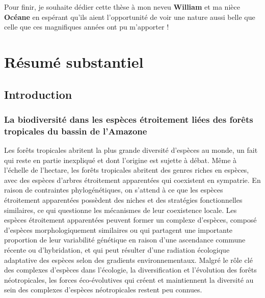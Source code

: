 \documentclass[12pt,twoside,a4paper, a]{article}
\let\oldsection\section
\renewcommand\section{\clearpage\oldsection}
\begin{document}
Pour finir, je souhaite dédier cette thèse à mon neveu \textbf{William} et ma
nièce \textbf{Océane} en espérant qu'ils aient l'opportunité de voir une
nature aussi belle que celle que ces magnifiques années ont pu
m'apporter !

\setcounter{tocdepth}{2}
\tableofcontents
\listoftables
\listoffigures

\hypertarget{ruxe9sumuxe9-substantiel}{%
\section{Résumé substantiel}\label{ruxe9sumuxe9-substantiel}}

\hypertarget{introduction}{%
\subsection{Introduction}\label{introduction}}

\hypertarget{la-biodiversituxe9-dans-les-espuxe8ces-uxe9troitement-liuxe9es-des-foruxeats-tropicales-du-bassin-de-lamazone}{%
\subsubsection{La biodiversité dans les espèces étroitement liées des forêts tropicales du bassin de l'Amazone}\label{la-biodiversituxe9-dans-les-espuxe8ces-uxe9troitement-liuxe9es-des-foruxeats-tropicales-du-bassin-de-lamazone}}

Les forêts tropicales abritent la plus grande diversité d'espèces au monde, un fait qui reste en partie inexpliqué et dont l'origine est sujette à débat. Même à l'échelle de l'hectare, les forêts tropicales abritent des genres riches en espèces, avec des espèces d'arbres étroitement apparentées qui coexistent en sympatrie. En raison de contraintes phylogénétiques, on s'attend à ce que les espèces étroitement apparentées possèdent des niches et des stratégies fonctionnelles similaires, ce qui questionne les mécanismes de leur coexistence locale. Les espèces étroitement apparentées peuvent former un complexe d'espèces, composé d'espèces morphologiquement similaires ou qui partagent une importante proportion de leur variabilité génétique en raison d'une ascendance commune récente ou d'hybridation, et qui peut résulter d'une radiation écologique adaptative des espèces selon des gradients environnementaux. Malgré le rôle clé des complexes d'espèces dans l'écologie, la diversification et l'évolution des forêts néotropicales, les forces éco-évolutives qui créent et maintiennent la diversité au sein des complexes d'espèces néotropicales restent peu connues.
\end{document}
